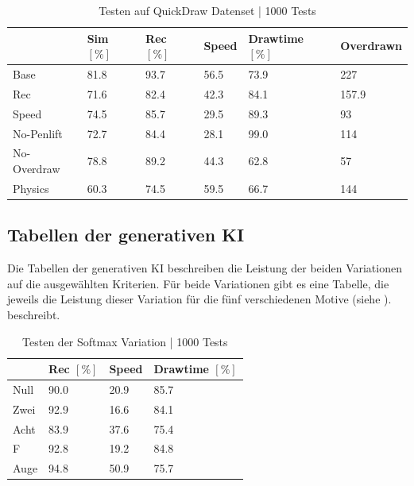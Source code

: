 \begin{table}[!ht]
    \centering
    \caption{Testen auf QuickDraw Datenset | 1000 Tests}\label{tab:Quickdraw}
    \begin{tabular}{|l|l|l|l|l|l|}
        \hline ~ & Sim $[\%]$ & Rec $[\%]$ & Speed & Drawtime $[\%]$ & Overdrawn \\ \hline
        Base & 81.8 & 93.7 & 56.5 & 73.9 & 227 \\ \hline
        Rec & 71.6 & 82.4 & 42.3 & 84.1 & 157.9 \\ \hline
        Speed & 74.5 & 85.7 & 29.5 & 89.3 & 93 \\ \hline
        No-Penlift & 72.7 & 84.4 & 28.1 & 99.0 & 114 \\ \hline
        No-Overdraw & 78.8 & 89.2 & 44.3 & 62.8 & 57 \\ \hline
        Physics & 60.3 & 74.5 & 59.5 & 66.7 & 144 \\ \hline
    \end{tabular}
\end{table}


\subsection{Tabellen der generativen KI}\label{sub:r_tab_gen} Die Tabellen der
generativen KI beschreiben die Leistung der beiden Variationen auf die
ausgewählten Kriterien. Für beide Variationen gibt es eine Tabelle, die jeweils
die Leistung dieser Variation für die fünf verschiedenen Motive (siehe
). beschreibt. 


\begin{table}[!ht]
    \centering
    \caption{Testen der Softmax Variation | 1000 Tests}\label{tab:gen-softmax}
    \begin{tabular}{|l|l|l|l|}
    \hline
        ~ & Rec $[\%]$ & Speed & Drawtime $[\%]$ \\ \hline
        Null & 90.0 & 20.9 & 85.7 \\ \hline
        Zwei & 92.9 & 16.6 & 84.1 \\ \hline
        Acht & 83.9 & 37.6 & 75.4 \\ \hline
        F & 92.8 & 19.2 & 84.8 \\ \hline
        Auge & 94.8 & 50.9 & 75.7 \\ \hline
    \end{tabular}
\end{table}


